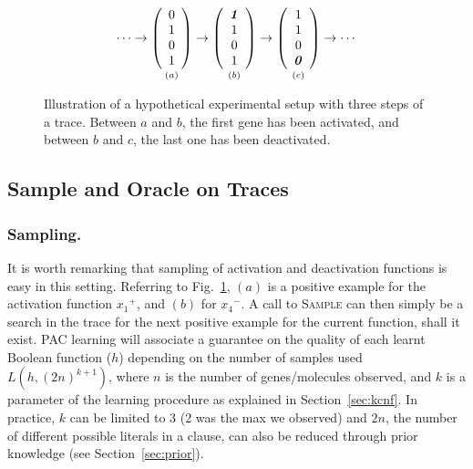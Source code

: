 \documentclass{llncs}
\begin{document}
\begin{figure}[htbp]
	{\large 
	\[
	\cdots
	\rightarrow
	\underset{\vspace{1em}(a)}{
		\left(\begin{array}{c}
		0\\ 1\\ 0\\ 1
		\end{array}\right)}
	\rightarrow
	\underset{\vspace{1em}(b)}{
		\left(\begin{array}{c}
		\textbf{\textit{1}}\\ 1\\ 0\\ 1
		\end{array}\right)}
	\rightarrow
	\underset{\vspace{1em}(c)}{
		\left(\begin{array}{c}
		1\\ 1\\ 0\\ \textbf{\textit 0}
		\end{array}\right)}
	\rightarrow
	\cdots
	\]
}
	\caption{\label{steps}Illustration of a hypothetical experimental setup with three steps of a trace. Between $a$ and $b$, the first gene has been activated, and between $b$ and $c$, the last one has been deactivated.}
\end{figure}



\subsection{Sample and Oracle on  Traces}


\subsubsection{Sampling.}

It is worth remarking that sampling of activation and deactivation functions is easy in this setting. Referring to Fig.~\ref{steps}, $(a)$ is a positive example for the activation function ${x_1}^+$, and $(b)$ for ${x_4}^-$.
A call to \textsc{Sample} can then simply be a search in the trace for the next positive example for the current function, shall it exist.
PAC learning will associate a guarantee on the quality of each learnt Boolean
function ($h$) depending on the number of samples used $L(h, (2n)^{k+1})$,
where $n$ is the number of genes/molecules observed, and $k$ is a parameter of
the learning procedure as explained in Section~\ref{sec:kcnf}.
In practice, $k$ can be limited to 3 (2 was the max we observed) and $2n$, the
number of different possible literals in a clause, can also be reduced through
prior knowledge (see Section~\ref{sec:prior}).
\end{document}
